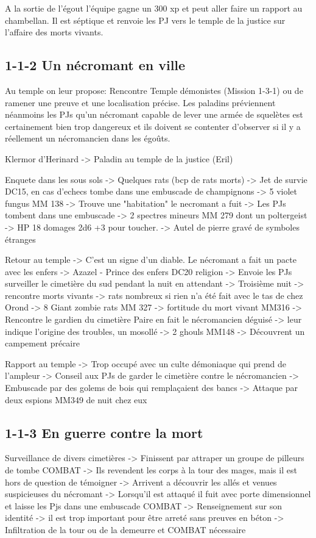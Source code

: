 A la sortie de l'égout l'équipe gagne un 300 xp et peut aller faire un rapport au chambellan. Il est
séptique et renvoie les PJ vers le temple de la justice sur l'affaire des morts vivants.

\subsection*{1-1-2 Un nécromant en ville}

Au temple on leur propose: Rencontre Temple démonistes (Mission 1-3-1) ou de ramener une preuve et une 
localisation précise. Les paladins préviennent néanmoins les PJs qu'un nécromant capable de lever une
armée de squelètes est certainement bien trop dangereux et ils doivent se contenter d'observer si il
y a réellement un nécromancien dans les égoûts.

Klermor d'Herinard -> Paladin au temple de la justice (Eril)

Enquete dans les sous sols 
 -> Quelques rats (bcp de rats morts)
 -> Jet de survie DC15, en cas d'echecs tombe dans une embuscade de champignons -> 5 violet fungus MM 138
 -> Trouve une "habitation" le necromant a fuit
 -> Les PJs tombent dans une embuscade -> 2 spectres mineurs MM 279 dont un poltergeist -> HP 18 domages 2d6 +3 pour toucher.
 -> Autel de pierre gravé de symboles étranges

Retour au temple
 -> C'est un signe d'un diable. Le nécromant a fait un pacte avec les enfers -> Azazel - Prince des enfers DC20 religion
 -> Envoie les PJs surveiller le cimetière du sud pendant la nuit en attendant
 -> Troisième nuit -> rencontre morts vivants -> rats nombreux si rien n'a été fait avec le tas de chez Orond -> 8 Giant zombie rats MM 327 -> fortitude du mort vivant MM316
 -> Rencontre le gardien du cimetière Paire en fait le nécromancien déguisé -> leur indique l'origine des troubles, un mosollé -> 2 ghouls MM148
 -> Découvrent un campement précaire

Rapport au temple
 -> Trop occupé avec un culte démoniaque qui prend de l'ampleur
 -> Conseil aux PJs de garder le cimetière contre le nécromancien
 -> Embuscade par des golems de bois qui remplaçaient des bancs
 -> Attaque par deux espions MM349 de nuit chez eux


\subsection*{1-1-3 En guerre contre la mort}

Surveillance de divers cimetières
 -> Finissent par attraper un groupe de pilleurs de tombe COMBAT
 -> Ils revendent les corps à la tour des mages, mais il est hors de question de témoigner
 -> Arrivent a découvrir les allés et venues suspicieuses du nécromant
 -> Lorsqu'il est attaqué il fuit avec porte dimensionnel et laisse les Pjs dans une embuscade COMBAT
 -> Renseignement sur son identité -> il est trop important pour être arreté sans preuves en béton
 -> Infiltration de la tour ou de la demeurre et COMBAT nécessaire


